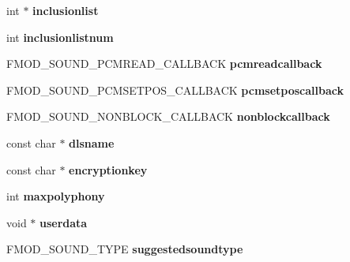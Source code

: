 \begin{DoxyCompactItemize}
int $\ast$ {\bfseries inclusionlist}
\item 
\mbox{\label{structFMOD__CREATESOUNDEXINFO_ab06a599a0214646ffe412edc75ef812e}} 
int {\bfseries inclusionlistnum}
\item 
\mbox{\label{structFMOD__CREATESOUNDEXINFO_a2d4f46a1719329771d73449abc6b71ed}} 
F\+M\+O\+D\+\_\+\+S\+O\+U\+N\+D\+\_\+\+P\+C\+M\+R\+E\+A\+D\+\_\+\+C\+A\+L\+L\+B\+A\+CK {\bfseries pcmreadcallback}
\item 
\mbox{\label{structFMOD__CREATESOUNDEXINFO_acca3da4c7a233e2455b92094a4aeb435}} 
F\+M\+O\+D\+\_\+\+S\+O\+U\+N\+D\+\_\+\+P\+C\+M\+S\+E\+T\+P\+O\+S\+\_\+\+C\+A\+L\+L\+B\+A\+CK {\bfseries pcmsetposcallback}
\item 
\mbox{\label{structFMOD__CREATESOUNDEXINFO_a8cd5e4d0cd9d2fa8b95fa76f3efff19a}} 
F\+M\+O\+D\+\_\+\+S\+O\+U\+N\+D\+\_\+\+N\+O\+N\+B\+L\+O\+C\+K\+\_\+\+C\+A\+L\+L\+B\+A\+CK {\bfseries nonblockcallback}
\item 
\mbox{\label{structFMOD__CREATESOUNDEXINFO_ae300f4a2f3a5e66fe0978a67a600a297}} 
const char $\ast$ {\bfseries dlsname}
\item 
\mbox{\label{structFMOD__CREATESOUNDEXINFO_a113b51853618c504f9324fa050b33e92}} 
const char $\ast$ {\bfseries encryptionkey}
\item 
\mbox{\label{structFMOD__CREATESOUNDEXINFO_ad2bc771aa24ba582d645845a3d98426c}} 
int {\bfseries maxpolyphony}
\item 
\mbox{\label{structFMOD__CREATESOUNDEXINFO_a9cf257c3807ab424017ceb9906f2abfa}} 
void $\ast$ {\bfseries userdata}
\item 
\mbox{\label{structFMOD__CREATESOUNDEXINFO_a48b58dbbb8f89152cb60ac081e667849}} 
F\+M\+O\+D\+\_\+\+S\+O\+U\+N\+D\+\_\+\+T\+Y\+PE {\bfseries suggestedsoundtype}
\item 
\mbox{\label{structFMOD__CREATESOUNDEXINFO_a3753f00938263edf696f5322448e4b4e}} 

\end{DoxyCompactItemize}
